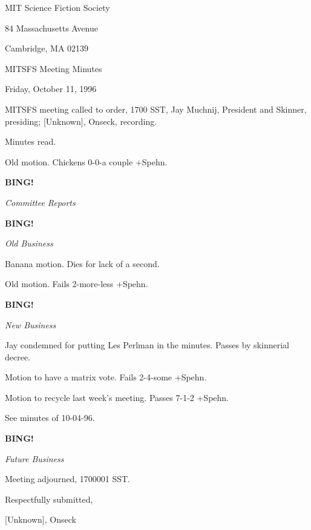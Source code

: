 \documentclass[12pt]{article}
\newcommand{\bing}{{\bf BING!} }
\newcommand{\goto}[1]{\bing \vskip 12pt \centerline{{\em{#1}}}}
\begin{document}
\begin{center}

MIT Science Fiction Society 

84 Massachusetts Avenue

Cambridge, MA 02139

\vspace{12pt}

MITSFS Meeting Minutes 

Friday, October 11, 1996

\end{center}
 
\vspace{18pt}

\setlength{\parskip}{6pt}

\noindent
MITSFS meeting called to order, 1700 SST,
Jay Muchnij, President and Skinner, presiding; [Unknown], Onseck, recording.

Minutes read.

Old motion. Chickens 0-0-a couple +Spehn.

\goto{Committee Reports}

\goto{Old Business}

Banana motion. Dies for lack of a second.

Old motion. Fails 2-more-less +Spehn.

\goto{New Business}

Jay condemned for putting Les Perlman in the minutes. Passes by skinnerial decree.

Motion to have a matrix vote. Fails 2-4-some +Spehn.

Motion to recycle last week's meeting. Passes 7-1-2 +Spehn.

See minutes of 10-04-96.

\goto{Future Business}

\vspace{12pt}

\noindent
Meeting adjourned, 1700001 SST.

\vspace{18pt}

\centerline{Respectfully submitted,}
\centerline{[Unknown], Onseck}
\end{document}
